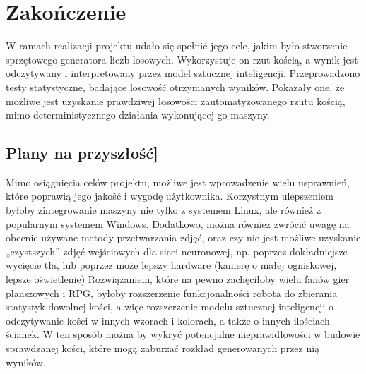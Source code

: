 
\chapter{Zakończenie}\label{ch:zakonczenie}

W ramach realizacji projektu udało się spełnić jego cele, jakim było stworzenie sprzętowego generatora liczb losowych.
Wykorzystuje on rzut kością, a wynik jest odczytywany i interpretowany przez model sztucznej inteligencji.
Przeprowadzono testy statystyczne, badające losowość otrzymanych wyników.
Pokazały one, że możliwe jest uzyskanie prawdziwej losowości zautomatyzowanego rzutu kością,
mimo deterministycznego działania wykonującej go maszyny.


\section{Plany na przyszłość]}
Mimo osiągnięcia celów projektu, możliwe jest wprowadzenie wielu usprawnień, które poprawią jego jakość i wygodę użytkownika.
Korzystnym ulepszeniem byłoby zintegrowanie maszyny nie tylko z systemem Linux, ale również z popularnym systemem Windows.
Dodatkowo, można również zwrócić uwagę na obecnie używane metody przetwarzania zdjęć, oraz czy nie jest możliwe uzyskanie „czystszych” zdjęć wejściowych dla sieci neuronowej, np.
poprzez dokładniejsze wycięcie tła, lub poprzez może lepszy hardware (kamerę o małej ogniskowej, lepsze oświetlenie)
Rozwiązaniem, które na pewno zachęciłoby wielu fanów gier planszowych i RPG, byłoby rozszerzenie funkcjonalności robota do
zbierania statystyk dowolnej kości, a więc rozszerzenie modelu sztucznej inteligencji o odczytywanie kości w innych wzorach i kolorach,
a także o innych ilościach ścianek.
W ten sposób można by wykryć potencjalne nieprawidłowości w budowie sprawdzanej kości, które mogą zaburzać rozkład generowanych przez nią wyników.

